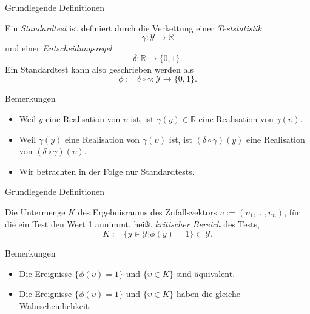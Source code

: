 \documentclass[
  8pt,
  ignorenonframetext,
]{beamer}
\providecommand{\tightlist}{%
  \setlength{\itemsep}{0pt}\setlength{\parskip}{0pt}}
\newcommand{\ups} {\upsilon}
\begin{document}
\begin{frame}{Grundlegende Definitionen}
\protect\hypertarget{grundlegende-definitionen-4}{}
\small
\begin{definition}[Standardtest]
\justifying
Ein \textit{Standardtest} ist definiert durch die Verkettung einer
\textit{Teststatistik}
\begin{equation}
\gamma : \mathcal{Y} \to \mathbb{R}
\end{equation}
und einer \textit{Entscheidungsregel}
\begin{equation}
\delta : \mathbb{R} \to \{0,1\}.
\end{equation}
Ein Standardtest kann also geschrieben werden als
\begin{equation}
\phi := \delta \circ \gamma : \mathcal{Y} \to \{0,1\}.
\end{equation}
\end{definition}

\footnotesize

Bemerkungen

\begin{itemize}
\tightlist
\item
  Weil \(y\) eine Realisation von \(\ups\) ist, ist
  \(\gamma(y) \in \mathbb{R}\) eine Realisation von \(\gamma(\ups)\).
\item
  Weil \(\gamma(y)\) eine Realisation von \(\gamma(\ups)\) ist, ist
  \((\delta \circ \gamma)(y)\) eine Realisation von
  \((\delta \circ \gamma)(\ups)\).
\item
  Wir betrachten in der Folge nur Standardtests.
\end{itemize}
\end{frame}

\begin{frame}{Grundlegende Definitionen}
\protect\hypertarget{grundlegende-definitionen-5}{}
\small
\begin{definition}
\justifying
Die Untermenge $K$ des Ergebnisraums des Zufallsvektors $\ups := (\ups_1,...,\ups_n)$,
für die ein Test den Wert 1 annimmt, heißt \textit{kritischer Bereich} des Tests,
\begin{equation}
K := \{y \in \mathcal{Y} |\phi(y) = 1 \} \subset \mathcal{Y}.
\end{equation}
\end{definition}

Bemerkungen

\begin{itemize}
\tightlist
\item
  Die Ereignisse \(\{\phi(\ups) = 1\}\) und \(\{\ups\in K\}\) sind
  äquivalent.
\item
  Die Ereignisse \(\{\phi(\ups) = 1\}\) und \(\{\ups\in K\}\) haben die
  gleiche Wahrscheinlichkeit.
\end{itemize}
\end{frame}
\end{document}
